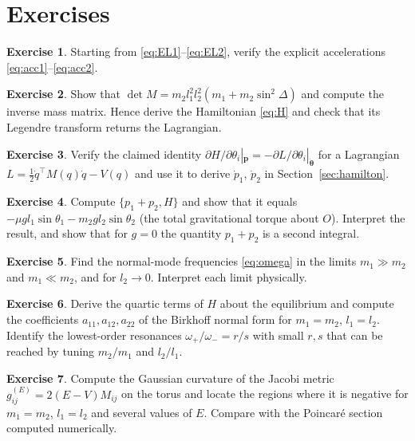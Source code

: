 \documentclass[11pt,a4paper]{book}
\theoremstyle{definition}
\newtheorem{exercise}{Exercise}[chapter]
\theoremstyle{remark}
\newcommand{\pb}[2]{\{#1,#2\}}
\begin{document}
\section*{Exercises}

\begin{exercise}
Starting from \eqref{eq:EL1}--\eqref{eq:EL2}, verify the explicit accelerations \eqref{eq:acc1}--\eqref{eq:acc2}.
\end{exercise}

\begin{exercise}
Show that $\det M=m_2l_1^2l_2^2(m_1+m_2\sin^2\Delta)$ and compute the inverse mass matrix. Hence derive the
Hamiltonian \eqref{eq:H} and check that its Legendre transform returns the Lagrangian.
\end{exercise}

\begin{exercise}
Verify the claimed identity $\partial H/\partial\theta_i|_{\bm p}=-\partial L/\partial\theta_i|_{\dot{\bm\theta}}$ for
a Lagrangian $L=\tfrac12\dot q^\top M(q)\dot q-V(q)$ and use it to derive $\dot p_1$, $\dot p_2$ in
Section~\ref{sec:hamilton}.
\end{exercise}

\begin{exercise}
Compute $\pb{p_1+p_2}{H}$ and show that it equals $-\mu g l_1\sin\theta_1-m_2gl_2\sin\theta_2$ (the total gravitational torque about $O$).
Interpret the result, and show that for $g=0$ the quantity $p_1+p_2$ is a second integral.
\end{exercise}

\begin{exercise}
Find the normal-mode frequencies \eqref{eq:omega} in the limits $m_1\gg m_2$ and $m_1\ll m_2$, and for
$l_2\to0$. Interpret each limit physically.
\end{exercise}

\begin{exercise}
Derive the quartic terms of $H$ about the equilibrium and compute the coefficients $a_{11},a_{12},a_{22}$ of the Birkhoff normal
form for $m_1=m_2$, $l_1=l_2$. Identify the lowest-order resonances $\omega_+/\omega_-=r/s$ with small $r,s$ that can be
reached by tuning $m_2/m_1$ and $l_2/l_1$.
\end{exercise}

\begin{exercise}
Compute the Gaussian curvature of the Jacobi metric $g^{(E)}_{ij}=2(E-V)M_{ij}$ on the torus and locate the regions
where it is negative for $m_1=m_2$, $l_1=l_2$ and several values of $E$. Compare with the Poincar\'e section computed
numerically.
\end{exercise}
\end{document}
